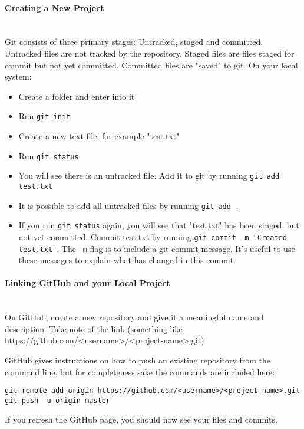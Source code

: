 \paragraph{Creating a New Project}\mbox{}\\
Git consists of three primary stages: Untracked, staged and committed. Untracked files are not tracked by the repository. Staged files are files staged for commit but not yet committed. Committed files are "saved" to git.
On your local system:
\begin{itemize}
    \item Create a folder and enter into it
    \item Run \verb|git init|
    \item Create a new text file, for example "test.txt"
    \item Run \verb|git status|
    \item You will see there is an untracked file. Add it to git by running \verb|git add test.txt|
    \item It is possible to add all untracked files by running \verb|git add .|
    \item If you run \verb|git status| again, you will see that "test.txt" has been staged, but not yet committed. Commit test.txt by running \verb|git commit -m "Created test.txt"|. The \verb|-m| flag is to include a git commit message. It's useful to use these messages to explain what has changed in this commit.
\end{itemize}

\paragraph{Linking GitHub and your Local Project}\mbox{}\\
On GitHub, create a new repository and give it a meaningful name and description. Take note of the link (something like https://github.com/\textless username\textgreater /\textless project-name\textgreater .git)

GitHub gives instructions on how to push an existing repository from the command line, but for completeness sake the commands are included here:
\begin{verbatim}
git remote add origin https://github.com/<username>/<project-name>.git
git push -u origin master    
\end{verbatim}

If you refresh the GitHub page, you should now see your files and commits.


